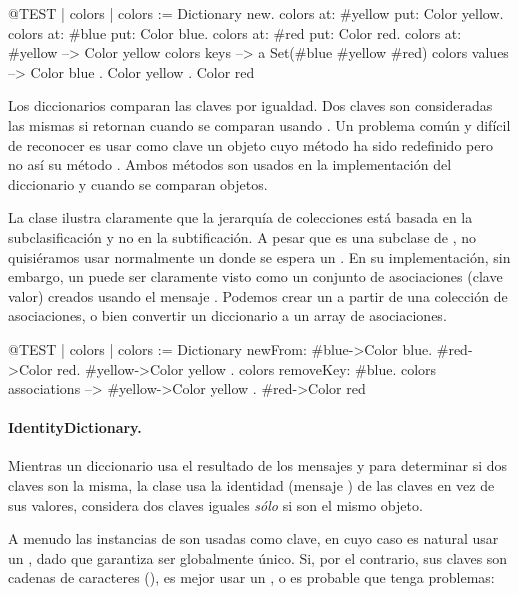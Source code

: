 \documentclass[a4paper,10pt,twoside]{book}
\begin{document}
\begin{code}{@TEST | colors |}
colors := Dictionary new.
colors at: #yellow put: Color yellow.
colors at: #blue put: Color blue.
colors at: #red put: Color red.
colors at: #yellow --> Color yellow
colors keys          --> a Set(#blue #yellow #red)
colors values       --> {Color blue . Color yellow . Color red}
\end{code}

Los diccionarios comparan las claves por igualdad. Dos claves son consideradas las mismas si retornan  cuando se comparan usando \ct{=}. Un problema com\'un y dif\'icil de reconocer es usar como clave un objeto cuyo m\'etodo \ct{=} ha sido redefinido pero no as\'i su m\'etodo . Ambos m\'etodos son usados en la implementaci\'on del diccionario y cuando se comparan objetos.

La clase  ilustra claramente que la jerarqu\'ia de colecciones est\'a basada en la subclasificaci\'on y no en la subtificaci\'on. A pesar que  es una subclase de , no quisi\'eramos usar normalmente un donde se espera un . En su implementaci\'on, sin embargo, un  puede ser claramente visto como un conjunto de asociaciones (clave valor) creados usando el mensaje . Podemos crear un  a partir de una colecci\'on de asociaciones, o bien convertir un diccionario a un array de asociaciones.

\begin{code}{@TEST | colors |}
colors := Dictionary newFrom: { #blue->Color blue. #red->Color red. #yellow->Color yellow }.
colors removeKey: #blue.
colors associations --> {#yellow->Color yellow . #red->Color red}
\end{code}

\paragraph{IdentityDictionary.}
Mientras un diccionario usa el resultado de los mensajes \ct{=} y  para determinar si dos claves son la misma, la clase  usa la identidad (mensaje ) de las claves en vez de sus valores, \ie considera dos claves iguales \emph{s\'olo} si son el mismo objeto.

A menudo las instancias de  son usadas como clave, en cuyo caso es natural usar un , dado que garantiza ser globalmente \'unico.
Si, por el contrario, sus claves son cadenas de caracteres (), es mejor usar un , o es probable que tenga problemas:
\end{document}
